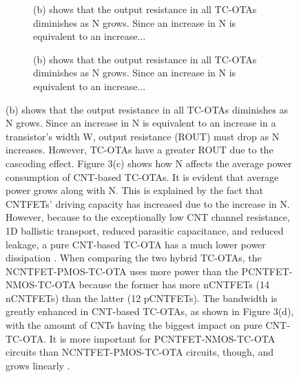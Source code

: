 \begin{figure}[htbp]
  \centering
  \begin{subfigure}[b]{0.48\linewidth}
    \centering
    \caption{(b) shows that the output resistance in all TC-OTAs diminishes as N grows. Since an increase in N is equivalent to an increase...}

  \end{subfigure}
  \hfill
  \begin{subfigure}[b]{0.48\linewidth}
    \centering
    \caption{(b) shows that the output resistance in all TC-OTAs diminishes as N grows. Since an increase in N is equivalent to an increase...}

  \end{subfigure}
  \caption{(b) shows that the output resistance in all TC-OTAs diminishes as N grows. Since an increase in N is equivalent to an increase in a transistor's width W, output resistance (ROUT) must drop as N increases. However, TC-OTAs have a greater ROUT due to the cascoding effect. Figure 3(c) shows how N affects the average power consumption of CNT-based TC-OTAs. It is evident that average power grows along with N. This is explained by the fact that CNTFETs' driving capacity has increased due to the increase in N. However, because to the exceptionally low CNT channel resistance, 1D ballistic transport, reduced parasitic capacitance, and reduced leakage, a pure CNT-based TC-OTA has a much lower power dissipation \cite{ref18,ref35}. When comparing the two hybrid TC-OTAs, the NCNTFET-PMOS-TC-OTA uses more power than the PCNTFET-NMOS-TC-OTA because the former has more nCNTFETs (14 nCNTFETs) than the latter (12 pCNTFETs). The bandwidth is greatly enhanced in CNT-based TC-OTAs, as shown in Figure 3(d), with the amount of CNTs having the biggest impact on pure CNT-TC-OTA. It is more important for PCNTFET-NMOS-TC-OTA circuits than NCNTFET-PMOS-TC-OTA circuits, though, and grows linearly \cite{ref6,ref19}.}

  \label{fig:group_67bqx}
\end{figure}


